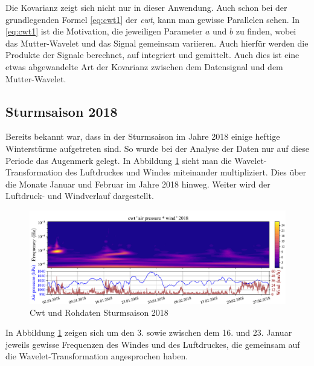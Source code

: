 \begin{refsection}
Die Kovarianz zeigt sich nicht nur in dieser Anwendung. Auch schon bei der grundlegenden Formel \ref{eq:cwt1} der \textit{cwt}, kann man gewisse Parallelen sehen. 
In \ref{eq:cwt1} ist die Motivation, die jeweiligen Parameter $a$ und $b$ zu finden, wobei das Mutter-Wavelet und das Signal gemeinsam variieren.
Auch hierfür werden die Produkte der Signale berechnet, auf integriert und gemittelt.
Auch dies ist eine etwas abgewandelte Art der Kovarianz zwischen dem Datensignal und dem Mutter-Wavelet.
 
\subsection{Sturmsaison 2018}
Bereits bekannt war, dass in der Sturmsaison im Jahre 2018 einige heftige Winterstürme aufgetreten sind.
So wurde bei der Analyse der Daten nur auf diese Periode das Augenmerk gelegt. 
In Abbildung \ref{fig:cwt_storm} \space sieht man die Wavelet-Transformation des Luftdruckes und Windes miteinander multipliziert.
Dies über die Monate Januar und Februar im Jahre 2018 hinweg.
Weiter wird der Luftdruck- und Windverlauf dargestellt.
 
\begin{figure}[h]
	\centering
	\includegraphics[width=1\textwidth]{papers/wwt/images/storm_airp_wind.pdf}
	\caption{Cwt und Rohdaten Sturmsaison 2018}
	\label{fig:cwt_storm}
\end{figure}

In Abbildung \ref{fig:cwt_storm} \space zeigen sich um den 3. sowie zwischen dem 16. und 23. Januar jeweils gewisse Frequenzen des Windes und des Luftdruckes, die gemeinsam auf die Wavelet-Transformation angesprochen haben.


\end{refsection}
